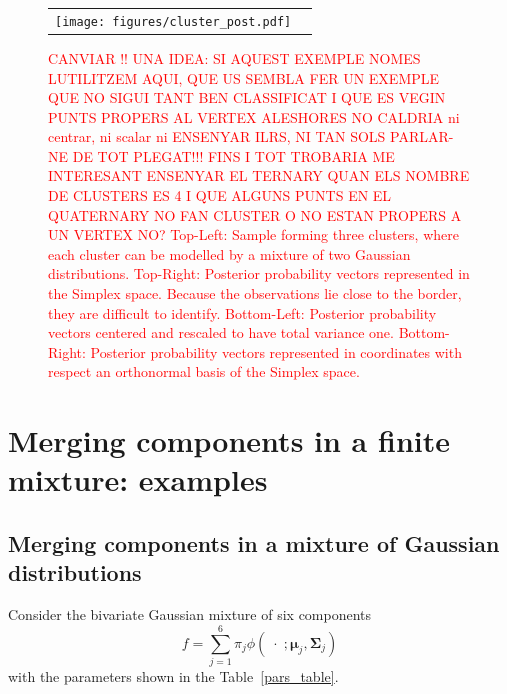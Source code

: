 \documentclass[submit]{smj}
\theoremstyle{definition}
\newcommand{\m}[1]{\boldsymbol{#1}}
\begin{document}
\begin{figure}[htbp]
\begin{center}
\begin{tabular}{cc}
  \texttt{[image: figures/cluster\_post.pdf]} \\
 \end{tabular}
 \caption{\textcolor{red}{CANVIAR !! UNA IDEA: SI AQUEST EXEMPLE NOMES LUTILITZEM AQUI, QUE US SEMBLA FER UN EXEMPLE QUE NO SIGUI TANT BEN CLASSIFICAT I QUE ES VEGIN PUNTS PROPERS AL VERTEX ALESHORES NO CALDRIA ni centrar, ni scalar ni ENSENYAR ILRS, NI TAN SOLS PARLAR-NE DE TOT PLEGAT!!! FINS I TOT TROBARIA ME INTERESANT ENSENYAR EL TERNARY QUAN ELS NOMBRE DE CLUSTERS ES 4 I QUE ALGUNS PUNTS EN EL QUATERNARY NO FAN CLUSTER O NO ESTAN PROPERS A UN VERTEX NO? Top-Left: Sample forming three clusters, where each cluster can be modelled by a mixture of two Gaussian distributions. Top-Right: Posterior probability vectors represented in the Simplex space. Because the observations lie close to the border, they are difficult to identify. Bottom-Left: Posterior probability vectors centered and rescaled to have total variance one. Bottom-Right: Posterior probability vectors represented in coordinates with respect an orthonormal basis of the Simplex space.}}\label{cluster_post}
\end{center}
\end{figure}


\section{Merging components in a finite mixture: examples}\label{merging_examples_dist}

\subsection{Merging components in a mixture of Gaussian distributions}

Consider the bivariate Gaussian mixture of six components \citep{baudry2010combining}
\[
f= \sum_{j=1}^6 \pi_j \phi(\;\cdot\; ;  \m\mu_j, \m\Sigma_j)
\]
with the parameters shown in the Table~\ref{pars_table}. 
\end{document}
